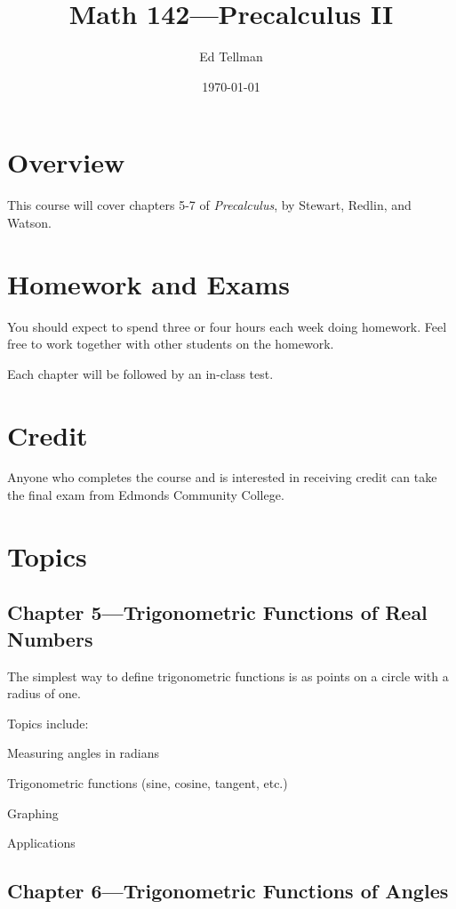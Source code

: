 \documentclass[fleqn, onecolumn]{article}
\author{Ed Tellman}
\title{Math 142---Precalculus II}
\date{\today}
\begin{document}
  \maketitle

  \section{Overview}
  This course will cover chapters 5-7 of {\em Precalculus}, by Stewart, Redlin, and Watson.  

  \section{Homework and Exams}

  You should expect to spend three or four hours each week doing homework.  Feel free to work together with other students
  on the homework.

  Each chapter will be followed by an in-class test.  

  \section{Credit}
  Anyone who completes the course and is interested in receiving credit can take the final exam from Edmonds Community
  College. 


  \section{Topics}

  \subsection{Chapter 5---Trigonometric Functions of Real Numbers}

  The simplest way to define trigonometric functions is as points on a circle with a radius of one.

  Topics include:
  \begin{itemize*}
    \item Measuring angles in radians
    \item Trigonometric functions (sine, cosine, tangent, etc.)
    \item Graphing 
    \item Applications 
  \end{itemize*}

  \subsection{Chapter 6---Trigonometric Functions of Angles}
\end{document}
